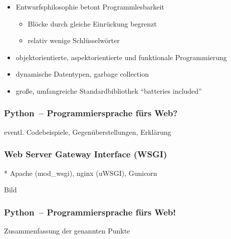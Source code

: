 \documentclass[
    t,
    smaller,
    compress,
]{beamer}
\begin{document}
\begin{frame}
  \begin{itemize}[<1->]
    \item Entwurfsphilosophie betont Programmlesbarkeit
    \begin{itemize}[<1->]
      \item Blöcke durch gleiche Einrückung begrenzt
      \item relativ wenige Schlüsselwörter
    \end{itemize}
    \item objektorientierte, aspektorientierte und funktionale Programmierung
    \item dynamische Datentypen, garbage collection
    \item große, umfangreiche Standardbibliothek “batteries included”
  \end{itemize}


\end{frame}


\begin{frame}
  \frametitle{Python~-- Programmiersprache fürs Web?}

  eventl. Codebeispiele, Gegenüberstellungen, Erklärung

\end{frame}


\begin{frame}
  \frametitle{Web Server Gateway Interface (WSGI)}
 * Apache (mod\_wsgi), nginx (uWSGI), Gunicorn

 Bild
\end{frame}


\begin{frame}
  \frametitle{Python~-- Programmiersprache fürs Web!}

  Zusammenfassung der genannten Punkte

\end{frame}
\end{document}

